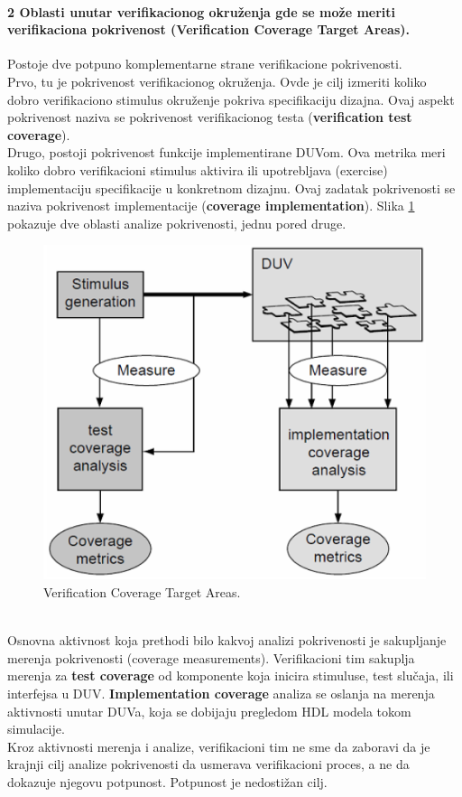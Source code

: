 \documentclass[a4paper, 12pt]{article}
\begin{document}
\paragraph{2 Oblasti unutar verifikacionog okruženja gde se može meriti verifikaciona pokrivenost (Verification Coverage Target Areas).}
\hfill \break
\indent Postoje dve potpuno komplementarne strane verifikacione pokrivenosti.\\
\indent Prvo, tu je pokrivenost verifikacionog okruženja. Ovde je cilj izmeriti koliko dobro verifikaciono stimulus okruženje pokriva specifikaciju dizajna. Ovaj aspekt pokrivenost naziva se pokrivenost verifikacionog testa (\textbf{verification test coverage}).\\
\indent Drugo, postoji pokrivenost funkcije implementirane DUVom. Ova metrika meri koliko dobro verifikacioni stimulus aktivira ili upotrebljava (exercise) implementaciju specifikacije u konkretnom dizajnu. Ovaj zadatak pokrivenosti se naziva pokrivenost implementacije (\textbf{coverage implementation}). Slika \ref{img-p10-1} pokazuje dve oblasti analize pokrivenosti, jednu pored druge.
\begin{figure}[h!]
\centering
\includegraphics[scale=0.6]{img-p10-1.png}
\caption{Verification Coverage Target Areas.}
\label{img-p10-1}
\end{figure}
\\ \indent Osnovna aktivnost koja prethodi bilo kakvoj analizi pokrivenosti je sakupljanje merenja pokrivenosti (coverage measurements). Verifikacioni tim sakuplja merenja za \textbf{test coverage} od komponente koja inicira stimuluse, test slučaja, ili interfejsa u DUV. \textbf{Implementation coverage} analiza se oslanja na merenja aktivnosti unutar DUVa, koja se dobijaju pregledom HDL modela tokom simulacije.\\
\indent Kroz aktivnosti merenja i analize, verifikacioni tim ne sme da zaboravi da je krajnji cilj analize pokrivenosti da usmerava verifikacioni proces, a ne da dokazuje njegovu potpunost. Potpunost je nedostižan cilj.
\end{document}
